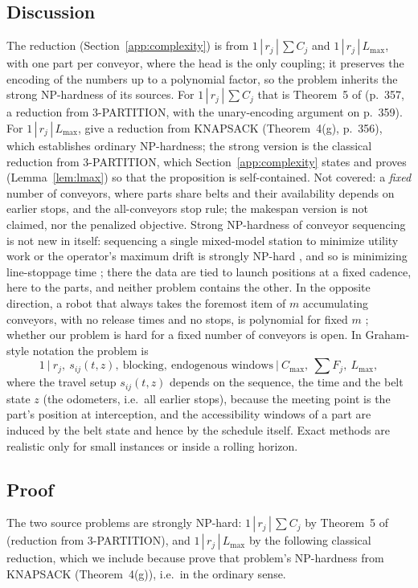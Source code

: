\documentclass[11pt,a4paper]{article}
\theoremstyle{plain}
\theoremstyle{definition}
\theoremstyle{remark}
\begin{document}
\subsection{Discussion}
The reduction (Section~\ref{app:complexity}) is from $1\,|\,r_j\,|\,\sum C_j$ and
$1\,|\,r_j\,|\,L_{\max}$, with one part per conveyor, where the head is the only
coupling; it preserves the encoding of the numbers up to a polynomial factor, so the
problem inherits the strong NP-hardness of its sources. For $1\,|\,r_j\,|\,\sum C_j$
that is Theorem~5 of \cite{Lenstra1977} (p.~357, a reduction from 3-PARTITION, with
the unary-encoding argument on p.~359). For $1\,|\,r_j\,|\,L_{\max}$,
\cite{Lenstra1977} give a reduction from KNAPSACK (Theorem~4(g), p.~356), which
establishes ordinary NP-hardness; the strong version is the classical reduction from
3-PARTITION, which Section~\ref{app:complexity} states and proves
(Lemma~\ref{lem:lmax}) so that the proposition is self-contained.
Not covered: a \emph{fixed} number of conveyors, where parts share belts
and their availability depends on earlier stops, and the all-conveyors stop rule; the
makespan version is not claimed, nor the penalized objective. Strong NP-hardness of
conveyor sequencing is not new in itself: sequencing a single mixed-model station to
minimize utility work or the operator's maximum drift is strongly NP-hard \cite{Tsai1995},
and so is minimizing line-stoppage time \cite{Xiaobo2000}; there the data are tied to launch
positions at a fixed cadence, here to the parts, and neither problem contains the other. In
the opposite direction, a robot that always takes the foremost item of $m$ accumulating
conveyors, with no release times and no stops, is polynomial for fixed $m$ \cite{Li2026};
whether our problem is hard for a fixed number of conveyors is open. In Graham-style
notation the problem is
\[
1\ \big|\ r_j,\ s_{ij}(t,z),\ \text{blocking},\ \text{endogenous windows}\ \big|\ C_{\max},\ \textstyle\sum F_j,\ L_{\max},
\]
where the travel setup $s_{ij}(t,z)$ depends on the sequence, the time and the belt
state $z$ (the odometers, i.e.\ all earlier stops), because the meeting point is the
part's position at interception, and the accessibility windows of a part are induced by
the belt state and hence by the schedule itself. Exact methods are realistic only for
small instances or inside a rolling horizon.

\subsection{Proof}
The two source problems are strongly NP-hard: $1\,|\,r_j\,|\,\sum C_j$ by Theorem~5 of
\cite{Lenstra1977} (reduction from 3-PARTITION), and $1\,|\,r_j\,|\,L_{\max}$ by the
following classical reduction, which we include because \cite{Lenstra1977} prove that
problem's NP-hardness from KNAPSACK (Theorem~4(g)), i.e.\ in the ordinary sense.
\end{document}

